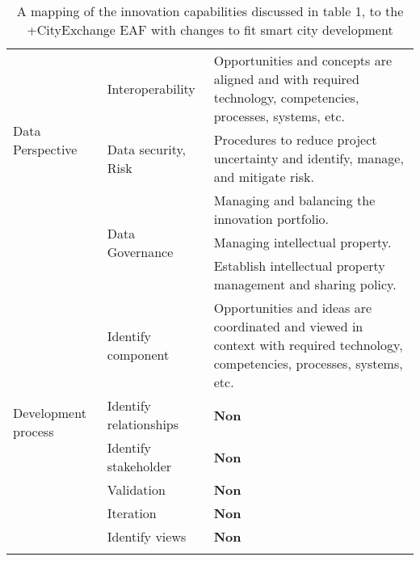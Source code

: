 {\begin{longtable}{|p{2.5cm}|p{3cm}|p{8cm}|}
        \hline        
    \multirow{3}{2.5cm}{Data Perspective} 
        & \multirow{1}{3cm}{Interoperability} & Opportunities and concepts are aligned and with required technology, competencies, processes, systems, etc.  \\  \cline{2-3}
        & \multirow{1}{3cm}{Data security, Risk} & Procedures to reduce project uncertainty and identify, manage, and mitigate risk. \\  \cline{2-3}
        & \multirow{3}{3cm}{Data Governance} & Managing and balancing the innovation portfolio. \\  \cline{3-3}
        & & Managing intellectual property. \\ \cline{3-3}
        & & Establish intellectual property management and sharing policy. \\ 
        \hline
    \multirow{6}{2.5cm}{Development process} 
        & \multirow{1}{3cm}{Identify component} & Opportunities and ideas are coordinated and viewed in context with required technology, competencies, processes, systems, etc.  \\  \cline{2-3}
        & \multirow{1}{4cm}{Identify relationships} & \textbf{Non} \\  \cline{2-3}
        & \multirow{1}{4cm}{Identify stakeholder} & \textbf{Non} \\  \cline{2-3}
        & \multirow{1}{3cm}{Validation} & \textbf{Non} \\  \cline{2-3}
        & \multirow{1}{3cm}{Iteration} & \textbf{Non} \\  \cline{2-3}
        & \multirow{1}{3cm}{Identify views} & \textbf{Non} \\
        \hline
    
    \caption{A mapping of the innovation capabilities discussed in \cite{louw2017architecting} table 1, to the +CityExchange EAF with changes to fit smart city development}
    \label{tab:4-innovation-capabilities}
\end{longtable}}